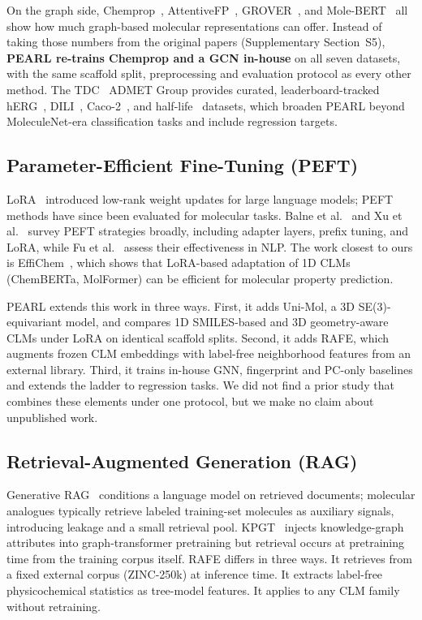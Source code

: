 \documentclass[pdflatex,sn-basic]{sn-jnl}%
\begin{document}
On the graph side, Chemprop~\cite{yang2019chemprop}, AttentiveFP~\cite{xiong2020attentivefp}, GROVER~\cite{rong2020grover}, and Mole-BERT~\cite{xia2023molecbert} all show how much graph-based molecular representations can offer. Instead of taking those numbers from the original papers (Supplementary Section~S5), \textbf{PEARL re-trains Chemprop and a GCN in-house} on all seven datasets, with the same scaffold split, preprocessing and evaluation protocol as every other method. The TDC~\cite{huang2021tdc} ADMET Group provides curated, leaderboard-tracked hERG~\cite{wang2016herg}, DILI~\cite{xu2019dili}, Caco-2~\cite{wang2016caco2}, and half-life~\cite{obach2008half} datasets, which broaden PEARL beyond MoleculeNet-era classification tasks and include regression targets.

\subsection{Parameter-Efficient Fine-Tuning (PEFT)}\label{sec:related_peft}
LoRA~\cite{hu2021lora} introduced low-rank weight updates for large language models; PEFT methods have since been evaluated for molecular tasks. Balne et al.~\cite{balne2024peft} and Xu et al.~\cite{xu2023peftreview} survey PEFT strategies broadly, including adapter layers, prefix tuning, and LoRA, while Fu et al.~\cite{fu2023effectiveness} assess their effectiveness in NLP. The work closest to ours is EffiChem~\cite{harod2025effichem}, which shows that LoRA-based adaptation of 1D CLMs (ChemBERTa, MolFormer) can be efficient for molecular property prediction.

PEARL extends this work in three ways. First, it adds Uni-Mol, a 3D SE(3)-equivariant model, and compares 1D SMILES-based and 3D geometry-aware CLMs under LoRA on identical scaffold splits. Second, it adds RAFE, which augments frozen CLM embeddings with label-free neighborhood features from an external library. Third, it trains in-house GNN, fingerprint and PC-only baselines and extends the ladder to regression tasks. We did not find a prior study that combines these elements under one protocol, but we make no claim about unpublished work.

\subsection{Retrieval-Augmented Generation (RAG)}\label{sec:related_rag}
Generative RAG~\cite{lewis2020rag} conditions a language model on retrieved documents; molecular analogues typically retrieve labeled training-set molecules as auxiliary signals, introducing leakage and a small retrieval pool. KPGT~\cite{liu2022kpgt} injects knowledge-graph attributes into graph-transformer pretraining but retrieval occurs at pretraining time from the training corpus itself. RAFE differs in three ways. It retrieves from a fixed external corpus (ZINC-250k) at inference time. It extracts label-free physicochemical statistics as tree-model features. It applies to any CLM family without retraining.
\end{document}
